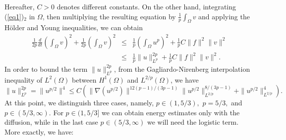 \documentclass[11pt,reqno]{amsart}%
\numberwithin{equation}{section}
\begin{document}
Hereafter, $C>0$ denotes different constants. On the other hand, integrating  (\ref{eq1})$_2$ in $\Omega$, then multiplying the resulting equation by $\frac1p\int_\Omega v$ and applying the H\"older and Young inequalities, we can obtain
\begin{eqnarray}
\frac{1}{2p}\frac{d}{dt}\left(\int_\Omega v\right)^2+\frac{1}{2p}\left(\int_\Omega v\right)^2
&\le&\frac{1}{p}\left(\int_\Omega u^p\right)^2+\frac{1}{p}C\|f\|^2\|v\|^2\nonumber\\
&\le&\frac{1}{p}\|u\|^{2p}_{L^p}+\frac{1}{p}C\|f\|^2\|v\|^2.\label{B-30}
\end{eqnarray}
%
%
In order to bound the term $\|u\|^{2p}_{L^p}$,  
 from the Gagliardo-Nirenberg interpolation inequality of $L^2(\Omega)$ between $H^1(\Omega)$ and $L^{2/p}(\Omega)$, we have
\begin{equation}\label{B-4z}
\|u\|^{2p}_{L^p}=\|u^{p/2}\|^4\le C\left(\|\nabla (u^{p/2})\|^{12(p-1)/(3p-1)}\|u^{p/2}\|^{8/(3p-1)}_{L^{2/p}}+\|u^{p/2}\|^4_{L^{2/p}}\right).
\end{equation}
At this point, we distinguish three cases, namely, $p\in(1,5/3),$ $p=5/3,$ and $p\in(5/3,\infty).$ For $p\in(1,5/3]$ we can obtain energy estimates only with the diffusion, while in the last case $p\in(5/3,\infty)$ we will need the logistic term. More exactly, we have:
\end{document}
